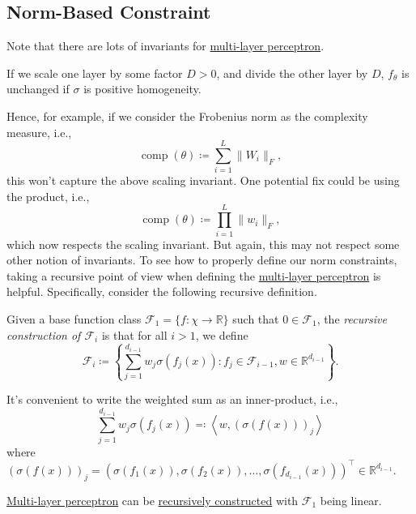 \subsection{Norm-Based Constraint}
Note that there are lots of invariants for \hyperref[def:MLP]{multi-layer perceptron}.

\begin{eg}[Scaling]
	If we scale one layer by some factor \(D > 0\), and divide the other layer by \(D\), \(f_\theta \) is unchanged if \(\sigma \) is positive homogeneity.
\end{eg}

Hence, for example, if we consider the Frobenius norm as the complexity measure, i.e.,
\[
	\operatorname{comp}(\theta ) \coloneqq \sum_{i=1}^{L} \lVert W_i \rVert _F,
\]
this won't capture the above scaling invariant. One potential fix could be using the product, i.e.,
\[
	\operatorname{comp}(\theta ) \coloneqq \prod_{i=1}^{L} \lVert w_i \rVert _F,
\]
which now respects the scaling invariant. But again, this may not respect some other notion of invariants. To see how to properly define our norm constraints, taking a recursive point of view when defining the \hyperref[def:MLP]{multi-layer perceptron} is helpful. Specifically, consider the following recursive definition.

\begin{definition}\label{def:recursive}
	Given a base function class \(\mathscr{F} _1 = \{ f \colon \chi \to \mathbb{R} \} \) such that \(0 \in \mathscr{F} _1\), the \emph{recursive construction of \(\mathscr{F} _i\)} is that for all \(i > 1\), we define
	\[
		\mathscr{F} _i \coloneqq \left\{ \sum_{j=1}^{d_{i-1} } w_j \sigma (f_j(x)) \colon f_j \in \mathscr{F} _{i-1}, w \in \mathbb{R} ^{d_{i-1}} \right\}.
	\]
\end{definition}

\begin{note}
	It's convenient to write the weighted sum as an inner-product, i.e.,
	\[
		\sum_{j=1}^{d_{i-1}} w_j \sigma (f_j(x)) \eqqcolon \left\langle w, (\sigma (f(x)))_j \right\rangle
	\]
	where \((\sigma (f(x)))_j = (\sigma (f_1(x)), \sigma (f_2(x)), \dots , \sigma (f_{d_{i-1}}(x)))^{\top} \in \mathbb{R} ^{d_{i-1}}\).
\end{note}

\begin{eg}
	\hyperref[def:MLP]{Multi-layer perceptron} can be \hyperref[def:recursive]{recursively constructed} with \(\mathscr{F} _1\) being linear.
\end{eg}

